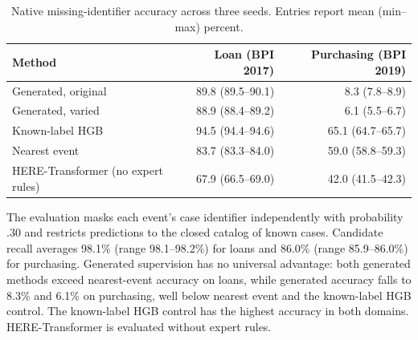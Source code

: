 \begin{table}[t]
\centering
\small
\caption{Native missing-identifier accuracy across three seeds. Entries report mean (min--max) percent.}
\label{tab:native-missing-id-results}
\begin{tabular}{lrr}
\toprule
Method & Loan (BPI 2017) & Purchasing (BPI 2019) \\
\midrule
Generated, original & 89.8 (89.5--90.1) & 8.3 (7.8--8.9) \\
Generated, varied & 88.9 (88.4--89.2) & 6.1 (5.5--6.7) \\
Known-label HGB & 94.5 (94.4--94.6) & 65.1 (64.7--65.7) \\
Nearest event & 83.7 (83.3--84.0) & 59.0 (58.8--59.3) \\
HERE-Transformer (no expert rules) & 67.9 (66.5--69.0) & 42.0 (41.5--42.3) \\
\bottomrule
\end{tabular}
\end{table}

The evaluation masks each event's case identifier independently with probability .30 and restricts predictions to the closed catalog of known cases. Candidate recall averages 98.1\% (range 98.1--98.2\%) for loans and 86.0\% (range 85.9--86.0\%) for purchasing. Generated supervision has no universal advantage: both generated methods exceed nearest-event accuracy on loans, while generated accuracy falls to 8.3\% and 6.1\% on purchasing, well below nearest event and the known-label HGB control. The known-label HGB control has the highest accuracy in both domains. HERE-Transformer is evaluated without expert rules.

